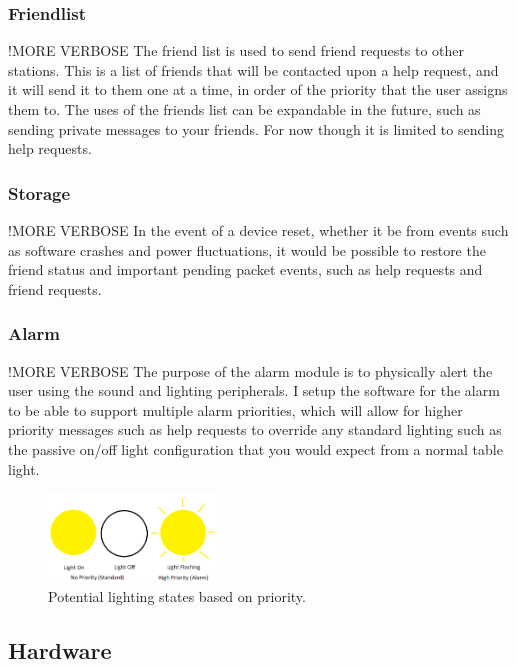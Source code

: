 \documentclass[journal,compsoc]{IEEEtran}
\begin{document}
\subsubsection{Friendlist} 
!MORE VERBOSE\newline
The friend list is used to send friend requests to other stations. This is a list of friends that will be contacted upon a help request, and it will send it to them one at a time, in order of the priority that the user assigns them to. The uses of the friends list can be expandable in the future, such as sending private messages to your friends. For now though it is limited to sending help requests.

\subsubsection{Storage} 
!MORE VERBOSE\newline
In the event of a device reset, whether it be from events such as software crashes and power fluctuations, it would be possible to restore the friend status and important pending packet events, such as help requests and friend requests.

\subsubsection{Alarm}
!MORE VERBOSE\newline
The purpose of the alarm module is to physically alert the user using the sound and lighting peripherals. I setup the software for the alarm to be able to support multiple alarm priorities, which will allow for higher priority messages such as help requests to override any standard lighting such as the passive on/off light configuration that you would expect from a normal table light.
\begin{figure}[ht] 	%
\centering
\includegraphics[width=0.4\textwidth]{AlarmPriority.png}
\caption{ \space Potential lighting states based on priority.}
\label{Alarm Priorties}
\end{figure}

\subsection{Hardware}
\end{document}
